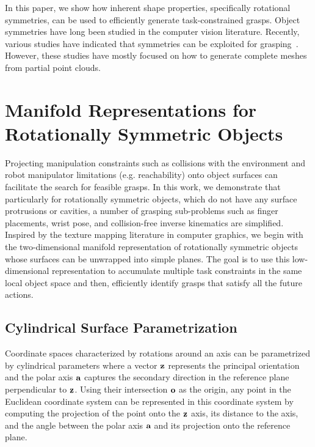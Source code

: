 \documentclass[a4paper,10pt,twocolumn]{article}
\begin{document}
In this paper, we show how inherent shape properties, specifically
rotational symmetries, can be used to efficiently generate 
task-constrained grasps. Object symmetries have long
been studied in the computer vision literature.
Recently, various studies have indicated that symmetries 
can be exploited for grasping~\cite{kroemerHumanoids2012, bohg2011mind}. However, 
these studies have mostly focused on how to generate complete 
meshes from partial point clouds.


\section{Manifold Representations for Rotationally Symmetric Objects}

Projecting manipulation constraints such as collisions with the environment and robot
manipulator limitations (e.g. reachability) onto object surfaces can facilitate the search
for feasible grasps. In this work, we demonstrate that particularly for rotationally
symmetric objects, which do not have any surface protrusions or cavities, a number of grasping sub-problems
such as finger placements, wrist pose, and collision-free inverse kinematics are simplified. 
Inspired by the texture mapping literature in computer graphics, we begin with the two-dimensional manifold
representation of rotationally symmetric objects whose surfaces can be unwrapped
into simple planes. The goal is to use this low-dimensional representation to accumulate
multiple task constraints in the same local object space and then, efficiently identify 
grasps that satisfy all the future actions. 

\subsection{Cylindrical Surface Parametrization}

Coordinate spaces characterized by rotations around an axis can be parametrized by cylindrical
parameters where a vector $\textbf{z}$ represents the principal orientation and the polar axis
$\textbf{a}$ captures the secondary direction in the reference plane perpendicular to $\textbf{z}$. 
Using their intersection $\textbf{o}$ as the origin, any point in the Euclidean coordinate system can
be represented in this coordinate system by computing the projection of the point onto the
$\textbf{z}$ axis, its distance to the axis, and the angle between the polar axis $\textbf{a}$ and its
projection onto the reference plane. 
\end{document}

